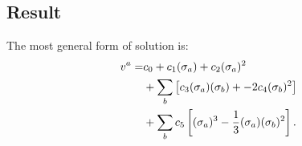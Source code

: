 \documentclass[aps,prd,final,twocolumn,floats,floatfix,nofootinbib,10pt]{revtex4-1}
\begin{document}
\subsection{Result}

The most general form of solution is:
\begin{align}
  v^a = & c_0 + c_1 (\sigma_a) + c_2 (\sigma_a)^2 \notag \\
        & + \sum_b \left[ c_3 (\sigma_a) (\sigma_b) + -2 c_4 (\sigma_b)^2
          \right] \notag \\
        & + \sum_b c_5 \left[
          (\sigma_a)^3 - \frac{1}{3} (\sigma_a) (\sigma_b)^2 \right].
\end{align}

\vfill
\end{document}

